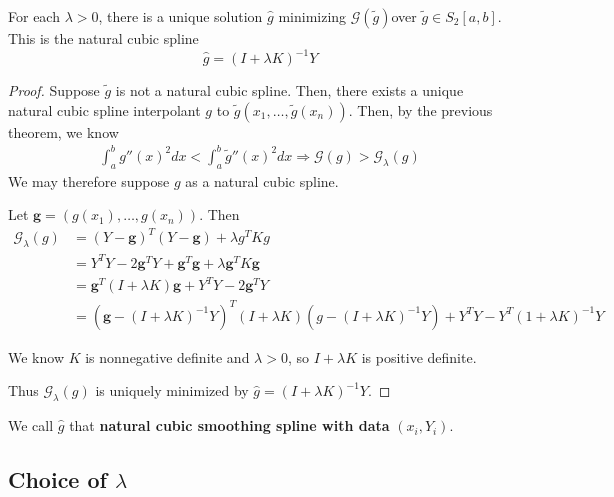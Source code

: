 \begin{thm}
  \label{defn:nonparametric_regression:4}
  For each $\lambda > 0$, there is a unique solution $\hat g$ minimizing
  $\mathcal{G}(\tilde g)$over $\tilde g \in S_{2}[a, b]$.  This is the
  natural cubic spline
  \begin{equation}
    \label{eq:71}
    \hat g = (I + \lambda K)^{-1} Y
  \end{equation}  
\end{thm}

\begin{proof}
  Suppose $\tilde g$ is not a natural cubic spline.  Then, there
  exists a unique natural cubic spline interpolant $g$ to $\tilde
  g(x_{1}, \dots, \tilde g(x_{n}))$.  Then, by the previous theorem,
  we know
  \begin{align}
    \label{eq:72}
    \int_{a}^{b} g''(x)^{2} dx < \int_{a}^{b} \tilde g''(x)^{2} dx
    \Rightarrow \mathcal{G} (g) > \mathcal{G}_{\lambda}(g)
  \end{align}
  We may therefore suppose $g$ as a natural cubic spline.

  Let $\mathbf{g} = (g(x_{1}), \dots, g(x_{n}))$.  Then
  \begin{align}
    \label{eq:73}
    \mathcal{G}_{\lambda}(g) &= (Y - \mathbf{g})^{T}(Y - \mathbf{g}) +
    \lambda g^{T} K g \\
    &= Y^{T} Y - 2 \mathbf{g}^{T} Y + \mathbf{g}^{T} \mathbf{g} +
    \lambda \mathbf{g}^{T} K \mathbf{g} \\
    &= \mathbf{g}^{T}(I + \lambda K) \mathbf{g} + Y^{T} Y - 2
    \mathbf{g}^{T} Y \\
    &= (\mathbf{g} - (I + \lambda K)^{-1} Y)^{T} (I + \lambda K)(g -
    (I + \lambda K)^{-1} Y) + Y^{T} Y - Y^{T}(1 + \lambda K)^{-1} Y
  \end{align}

  We know $K$ is nonnegative definite and $\lambda > 0$, so $I +
  \lambda K$ is positive definite.

  Thus $\mathcal{G}_{\lambda}(g)$ is uniquely minimized by $\hat g =
  (I + \lambda K)^{-1} Y$.

\end{proof}

We call $\hat g$ that \textbf{natural cubic smoothing spline with
  data} $(x_{i}, Y_{i})$.

\subsection{Choice of $\lambda$}
\label{sec:choice-lambda}

